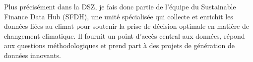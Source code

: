 Plus précisément dans la DSZ, je fais donc partie de l'équipe du Sustainable Finance Data Hub (SFDH), une unité spécialisée qui collecte et enrichit les données liées au climat pour soutenir la prise de décision optimale en matière de changement climatique. 
Il fournit un point d'accès central aux données, répond aux questions méthodologiques et prend part à des projets de génération de données innovants.






